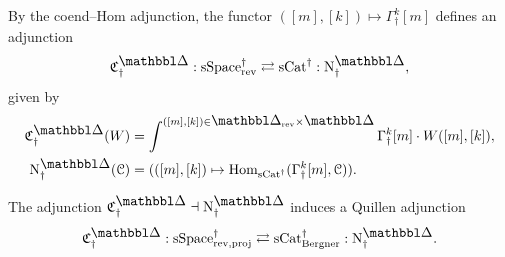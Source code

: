 \documentclass[a4paper,dvipdfmx,11pt]{amsart}
\begin{document}
\begin{construction}
  By the coend--Hom adjunction, the functor $([m],[k])\mapsto\Gamma^k_{\dag}[m]$ defines an adjunction
  \begin{align}
    \mathfrak{C}^{\prism}_{\dag} : \sSpace^{\dag}_{\rev} \rightleftarrows \sCat^{\dag} : \N^{\prism}_{\dag}, 
  \end{align}
  given by
  \begin{align}
    \mathfrak{C}^{\prism}_{\dag}(W)
    &= 
    \int^{([m],[k]) \in \prism_{\rev} \times \prism}\Gamma^{k}_{\dag}[m]\cdot W([m],[k]), \\
    \N^{\prism}_{\dag}(\calC)
    &=
    (([m],[k])\mapsto\Hom_{\sCat^{\dag}}(\Gamma^k_{\dag}[m],\calC)).
  \end{align}
\end{construction}

\begin{lemma}\label{jt.lem.quillen}
  The adjunction $\mathfrak{C}^{\prism}_{\dag} \dashv \N^{\prism}_{\dag}$ induces a Quillen adjunction
  \begin{align}
    \mathfrak{C}^{\prism}_{\dag}:\sSpace^{\dag}_{\rev,\proj}
    \rightleftarrows
    \sCat^{\dag}_{\Bergner}:\N^{\prism}_{\dag}.
  \end{align}
\end{lemma}
\end{document}
